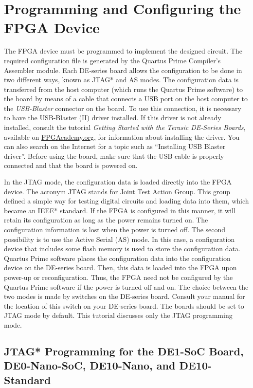 \section{Programming and Configuring the FPGA Device}

The FPGA device must be programmed to implement the designed 
circuit. The required configuration file is generated by the Quartus Prime 
Compiler's Assembler module. Each DE-series board allows the configuration to 
be done in two different ways, known as JTAG* and AS modes.
The configuration data is transferred from the host computer (which runs the 
Quartus Prime software) to the board by means of a cable that connects 
a USB port on the host computer to the {\it USB-Blaster} connector on the board.
To use this connection, it is necessary to have the USB-Blaster (II) driver 
installed. If this driver is not already installed, consult the 
tutorial {\it Getting Started with the Terasic DE-Series Boards},
available on {\small \href{https://www.fpgacademy.org/tutorials.html} {FPGAcademy.org}},
for information about installing the driver. You can also search on the Internet for a
topic such as ``Installing USB Blaster driver''.
Before using the board, make sure that the USB cable is properly connected
and that the board is powered on.
 
In the JTAG mode, the configuration data is loaded directly
into the FPGA device. The acronym JTAG stands for Joint Test Action Group. 
This group defined a simple way for testing digital circuits and loading data 
into them, which became an IEEE* standard. If the FPGA is configured in 
this manner, it will retain its 
configuration as long as the power remains turned on. 
The configuration information is lost when the power is turned off.
The second possibility is to use the Active Serial (AS) mode.
In this case, a configuration device that includes some flash memory is used 
to store the configuration data. Quartus Prime software places the configuration 
data into the configuration device on the DE-series board. Then, this data is loaded 
into the FPGA upon power-up or reconfiguration.
Thus, the FPGA need not be configured by the Quartus Prime software if the power 
is turned off and on. 
The choice between the two modes is made by switches on the DE-series 
board. Consult your manual for the location of this switch on your DE-series board. The boards should be set to JTAG mode by default.
This tutorial discusses only the JTAG programming mode.

\subsection{JTAG* Programming for the DE1-SoC Board, DE0-Nano-SoC, DE10-Nano, and DE10-Standard}

